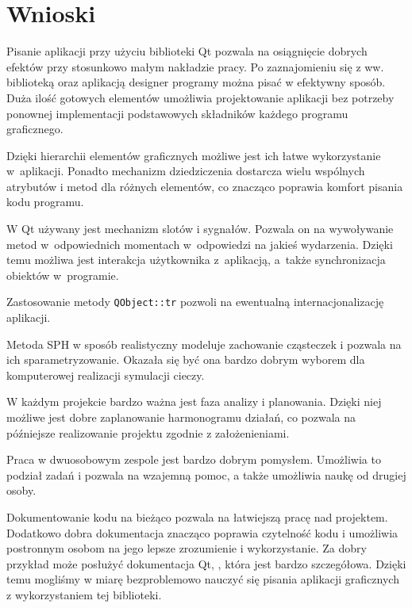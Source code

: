 \section{Wnioski}
Pisanie aplikacji przy użyciu biblioteki \textsf{Qt} pozwala na osiągnięcie dobrych efektów przy stosunkowo małym nakładzie pracy. Po zaznajomieniu się z ww. biblioteką oraz aplikacją \textsf{designer} programy można pisać w efektywny sposób. Duża ilość gotowych elementów umożliwia projektowanie aplikacji bez potrzeby ponownej implementacji podstawowych składników każdego programu graficznego.

Dzięki hierarchii elementów graficznych możliwe jest ich łatwe wykorzystanie w~aplikacji. Ponadto mechanizm dziedziczenia dostarcza wielu wspólnych atrybutów i metod dla różnych elementów, co znacząco poprawia komfort pisania kodu programu.

W \textsf{Qt} używany jest mechanizm slotów i sygnałów. Pozwala on na wywoływanie metod w~odpowiednich momentach w~odpowiedzi na jakieś wydarzenia. Dzięki temu możliwa jest interakcja użytkownika z~aplikacją, a~także synchronizacja obiektów w~programie.

Zastosowanie metody \texttt{QObject::tr} pozwoli na ewentualną internacjonalizację aplikacji. 

Metoda SPH w sposób realistyczny modeluje zachowanie cząsteczek i pozwala na ich sparametryzowanie. Okazała się być ona bardzo dobrym wyborem dla komputerowej realizacji symulacji cieczy.

W każdym projekcie bardzo ważna jest faza analizy i planowania. Dzięki niej możliwe jest dobre zaplanowanie harmonogramu działań, co pozwala na późniejsze realizowanie projektu zgodnie z założenieniami.

Praca w dwuosobowym zespole jest bardzo dobrym pomysłem. Umożliwia to podział zadań i pozwala na wzajemną pomoc, a także umożliwia naukę od drugiej osoby.

Dokumentowanie kodu na bieżąco pozwala na łatwiejszą pracę nad projektem. Dodatkowo dobra dokumentacja znacząco poprawia czytelność kodu i umożliwia postronnym osobom na jego lepsze zrozumienie i wykorzystanie. Za dobry przykład może posłużyć dokumentacja \textsf{Qt}, \cite{website:qt} , która jest bardzo szczegółowa. Dzięki temu mogliśmy w miarę bezproblemowo nauczyć się pisania aplikacji graficznych z wykorzystaniem tej biblioteki.